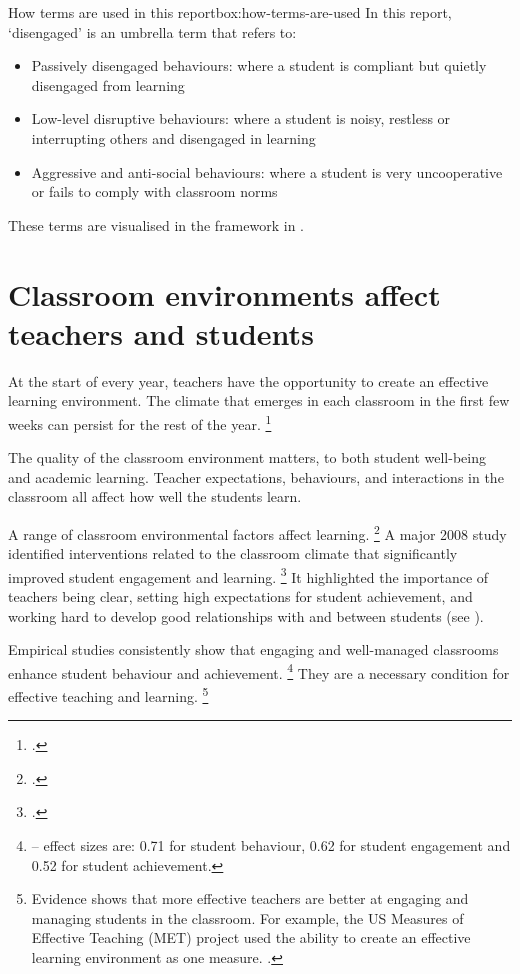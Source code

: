 \documentclass{grattan}
\begin{document}
\begin{addsmallbox}{How terms are used in this report}{box:how-terms-are-used}
In this report, `disengaged' is an umbrella term that refers to:
\begin{itemize}[leftmargin=1em]
    \item Passively disengaged behaviours: where a student is compliant but quietly disengaged from learning
    \item Low-level disruptive behaviours: where a student is noisy, restless or interrupting others and disengaged in learning
    \item Aggressive and anti-social behaviours: where a student is very uncooperative or fails to comply with classroom norms
\end{itemize}
These terms are visualised in the framework in .
\end{addsmallbox}

\section{Classroom environments affect teachers and students}\label{sec:classroom-environments-affect-teachers-students}
At the start of every year, teachers have the opportunity to create an effective learning environment. The climate that emerges in each classroom in the first few weeks can persist for the rest of the year.%
    \footcites{Marzano2003ClassroomManagementWorks}{Rogers2015ClassroomBehaviourPractical}

The quality of the classroom environment matters, to both student well-being and academic learning. Teacher expectations, behaviours, and interactions in the classroom all affect how well the students learn.

A range of classroom environmental factors affect learning.%
    \footcites{Hattie2008visiblelearningsynthesis}{Marzano2003ClassroomManagementWorks}{Oliver2011TeacherClassroomManagement}{Simonsen2008EvidenceBasedPractices}
A major 2008 study identified interventions related to the classroom climate that significantly improved student engagement and learning.%
    \footcite{Hattie2008visiblelearningsynthesis}
It highlighted the importance of teachers being clear, setting high expectations for student achievement, and working hard to develop good relationships with and between students (see ).

Empirical studies consistently show that engaging and well-managed classrooms enhance student behaviour and achievement.%
    \footnote{\textcites{Marzano2003ClassroomManagementWorks}{Oliver2011TeacherClassroomManagement} -- effect sizes are: 0.71 for student behaviour, 0.62 for student engagement and 0.52 for student achievement.}
They are a necessary condition for effective teaching and learning.%
    \footnote{Evidence shows that more effective teachers are better at engaging and managing students in the classroom. For example, the US Measures of Effective Teaching (MET) project used the ability to create an effective learning environment as one measure. \textcite{Kane2010LearningAboutTeaching}.}
\end{document}
